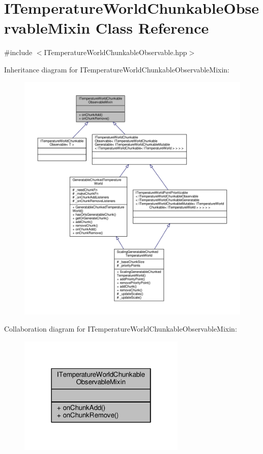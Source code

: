 \hypertarget{class_i_temperature_world_chunkable_observable_mixin}{\section{I\-Temperature\-World\-Chunkable\-Observable\-Mixin Class Reference}
\label{class_i_temperature_world_chunkable_observable_mixin}
}


{\ttfamily \#include $<$I\-Temperature\-World\-Chunkable\-Observable.\-hpp$>$}



Inheritance diagram for I\-Temperature\-World\-Chunkable\-Observable\-Mixin\-:
\nopagebreak
\begin{figure}[H]
\begin{center}
\leavevmode
\includegraphics[width=350pt]{class_i_temperature_world_chunkable_observable_mixin__inherit__graph}
\end{center}
\end{figure}


Collaboration diagram for I\-Temperature\-World\-Chunkable\-Observable\-Mixin\-:
\nopagebreak
\begin{figure}[H]
\begin{center}
\leavevmode
\includegraphics[width=226pt]{class_i_temperature_world_chunkable_observable_mixin__coll__graph}
\end{center}
\end{figure}
